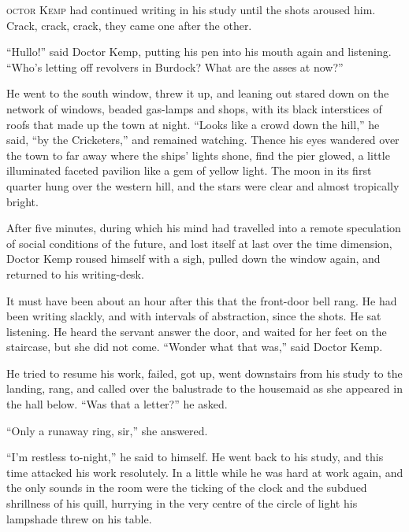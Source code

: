 \label{ch:17}
\begin{ChapterStart}
\vspace*{2\nbs}

\vspace{1.5\nbs}
\vspace{0.75\nbs}
\end{ChapterStart}

\kern-6pt\textsc{octor Kemp} had continued writing in his study until the shots aroused him. Crack, crack, crack, they came one after the other.

“Hullo!” said Doctor Kemp, putting his pen into his mouth again and listening. “Who’s letting off revolvers in Burdock? What are the asses at now?”

He went to the south window, threw it up, and leaning out stared down on the network of windows, beaded gas-lamps and shops, with its black interstices of roofs that made up the town at night. “Looks like a crowd down the hill,” he said, “by the Cricketers,” and remained watching. Thence his eyes wandered over the town to far away where the ships’ lights shone, find the pier glowed, a little illuminated faceted pavilion like a gem of yellow light. The moon in its first quarter hung over the western hill, and the stars were clear and almost tropically bright.

After five minutes, during which his mind had travelled into a remote speculation of social conditions of the future, and lost itself at last over the time dimension, Doctor Kemp roused himself with a sigh, pulled down the window again, and returned to his writing-desk.

It must have been about an hour after this that the front-door bell rang. He had been writing slackly, and with intervals of abstraction, since the shots. He sat listening. He heard the servant answer the door, and waited for her feet on the staircase, but she did not come. “Wonder what that was,” said Doctor Kemp.

He tried to resume his work, failed, got up, went downstairs from his study to the landing, rang, and called over the balustrade to the housemaid as she appeared in the hall below. “Was that a letter?” he asked.

“Only a runaway ring, sir,” she answered.

“I’m restless to-night,” he said to himself. He went back to his study, and this time attacked his work resolutely. In a little while he was hard at work again, and the only sounds in the room were the ticking of the clock and the subdued shrillness of his quill, hurrying in the very centre of the circle of light his lampshade threw on his table.


